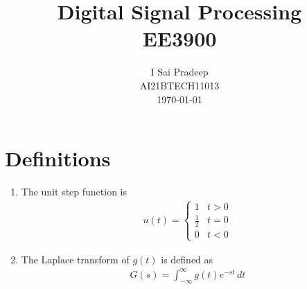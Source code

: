 \documentclass[journal,12pt,twocolumn]{IEEEtran}
\numberwithin{equation}{section}
\renewcommand\thesection{\arabic{section}}
\begin{document}
                             
\title{ Digital Signal Processing  \\ 
	\Large EE3900
}
\author{I Sai Pradeep \\ \normalsize AI21BTECH11013 \\ \vspace*{20pt} \normalsize \today  }
 \maketitle 
 \tableofcontents
 \section{Definitions}
\begin{enumerate}[label=\arabic*.,ref=\thesection.\theenumi]
\item The unit step function is 
\begin{align}
\label{eq:unit-step}
u(t) =
\begin{cases}
1 & t > 0
\\
	\frac{1}{2} & t = 0
\\
0 & t < 0
\end{cases}
\end{align}
\item The Laplace transform of $g(t)$ is defined as 
\begin{align}
	G(s) = \int_{-\infty}^{\infty} g(t) e^{-st}\, dt
\end{align}
 \end{enumerate}
\end{document}
